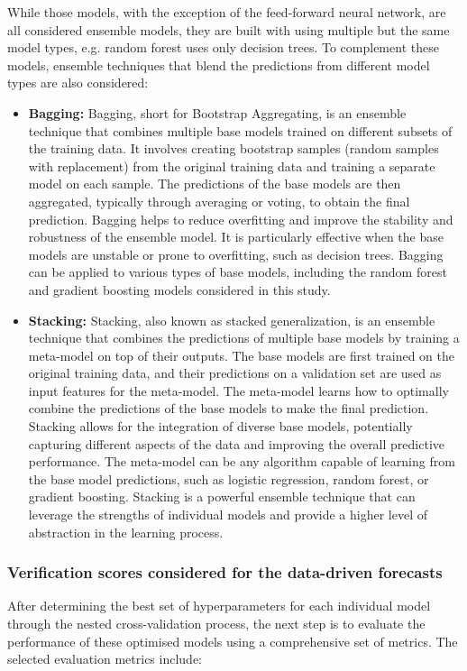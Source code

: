While those models, with the exception of the feed-forward neural network, are all considered ensemble models, they are built with using multiple but the same model types, e.g. random forest uses only decision trees. To complement these models, ensemble techniques that blend the predictions from different model types are also considered:


\begin{itemize}
    
    \item \textbf{Bagging:} Bagging, short for Bootstrap Aggregating, is an ensemble technique that combines multiple base models trained on different subsets of the training data. It involves creating bootstrap samples (random samples with replacement) from the original training data and training a separate model on each sample. The predictions of the base models are then aggregated, typically through averaging or voting, to obtain the final prediction. Bagging helps to reduce overfitting and improve the stability and robustness of the ensemble model. It is particularly effective when the base models are unstable or prone to overfitting, such as decision trees. Bagging can be applied to various types of base models, including the random forest and gradient boosting models considered in this study.
    
    \item \textbf{Stacking:} Stacking, also known as stacked generalization, is an ensemble technique that combines the predictions of multiple base models by training a meta-model on top of their outputs. The base models are first trained on the original training data, and their predictions on a validation set are used as input features for the meta-model. The meta-model learns how to optimally combine the predictions of the base models to make the final prediction. Stacking allows for the integration of diverse base models, potentially capturing different aspects of the data and improving the overall predictive performance. The meta-model can be any algorithm capable of learning from the base model predictions, such as logistic regression, random forest, or gradient boosting. Stacking is a powerful ensemble technique that can leverage the strengths of individual models and provide a higher level of abstraction in the learning process.

\end{itemize}


\subsubsection{Verification scores considered for the data-driven forecasts}
After determining the best set of hyperparameters for each individual model through the nested cross-validation process, the next step is to evaluate the performance of these optimised models using a comprehensive set of metrics. The selected evaluation metrics include:

